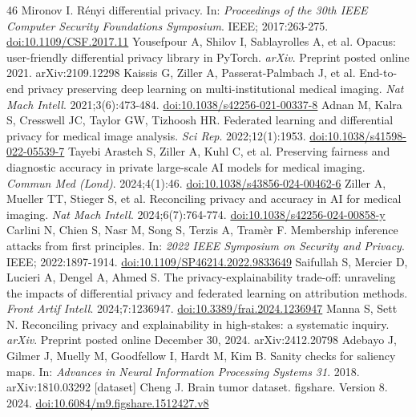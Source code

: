 \begin{thebibliography}{46}
 Mironov I. R\'enyi differential privacy. In: \textit{Proceedings of the 30th IEEE Computer Security Foundations Symposium}. IEEE; 2017:263-275. \href{https://doi.org/10.1109/CSF.2017.11}{doi:10.1109/CSF.2017.11}
 Yousefpour A, Shilov I, Sablayrolles A, et al. Opacus: user-friendly differential privacy library in PyTorch. \textit{arXiv}. Preprint posted online 2021. arXiv:2109.12298
 Kaissis G, Ziller A, Passerat-Palmbach J, et al. End-to-end privacy preserving deep learning on multi-institutional medical imaging. \textit{Nat Mach Intell}. 2021;3(6):473-484. \href{https://doi.org/10.1038/s42256-021-00337-8}{doi:10.1038/s42256-021-00337-8}
 Adnan M, Kalra S, Cresswell JC, Taylor GW, Tizhoosh HR. Federated learning and differential privacy for medical image analysis. \textit{Sci Rep}. 2022;12(1):1953. \href{https://doi.org/10.1038/s41598-022-05539-7}{doi:10.1038/s41598-022-05539-7}
 Tayebi Arasteh S, Ziller A, Kuhl C, et al. Preserving fairness and diagnostic accuracy in private large-scale AI models for medical imaging. \textit{Commun Med (Lond)}. 2024;4(1):46. \href{https://doi.org/10.1038/s43856-024-00462-6}{doi:10.1038/s43856-024-00462-6}
 Ziller A, Mueller TT, Stieger S, et al. Reconciling privacy and accuracy in AI for medical imaging. \textit{Nat Mach Intell}. 2024;6(7):764-774. \href{https://doi.org/10.1038/s42256-024-00858-y}{doi:10.1038/s42256-024-00858-y}
 Carlini N, Chien S, Nasr M, Song S, Terzis A, Tram\`er F. Membership inference attacks from first principles. In: \textit{2022 IEEE Symposium on Security and Privacy}. IEEE; 2022:1897-1914. \href{https://doi.org/10.1109/SP46214.2022.9833649}{doi:10.1109/SP46214.2022.9833649}
 Saifullah S, Mercier D, Lucieri A, Dengel A, Ahmed S. The privacy-explainability trade-off: unraveling the impacts of differential privacy and federated learning on attribution methods. \textit{Front Artif Intell}. 2024;7:1236947. \href{https://doi.org/10.3389/frai.2024.1236947}{doi:10.3389/frai.2024.1236947}
 Manna S, Sett N. Reconciling privacy and explainability in high-stakes: a systematic inquiry. \textit{arXiv}. Preprint posted online December 30, 2024. arXiv:2412.20798
 Adebayo J, Gilmer J, Muelly M, Goodfellow I, Hardt M, Kim B. Sanity checks for saliency maps. In: \textit{Advances in Neural Information Processing Systems 31}. 2018. arXiv:1810.03292
 [dataset] Cheng J. Brain tumor dataset. figshare. Version 8. 2024. \href{https://doi.org/10.6084/m9.figshare.1512427.v8}{doi:10.6084/m9.figshare.1512427.v8}

\end{thebibliography}
